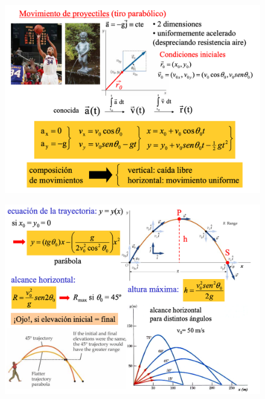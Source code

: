 \newpage %
\begin{figure}[H]
		\centering
		\includegraphics[width=1\textwidth]{imagenes/imagenes02/T02IM22.png}
		\end{figure}
		
\begin{figure}[H]
		\centering
		\includegraphics[width=1\textwidth]{imagenes/imagenes02/T02IM23.png}
		\end{figure}


